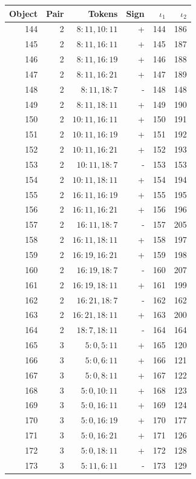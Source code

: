 \begin{center}\begin{tabular}{rrrrrr}\toprule Object & Pair & Tokens & Sign & $\iota_1$ & $\iota_2$\\\midrule
144 & 2 & $8:11,10:11$ & + & 144 & 186\\
145 & 2 & $8:11,16:11$ & + & 145 & 187\\
146 & 2 & $8:11,16:19$ & + & 146 & 188\\
147 & 2 & $8:11,16:21$ & + & 147 & 189\\
148 & 2 & $8:11,18:7$ & - & 148 & 148\\
149 & 2 & $8:11,18:11$ & + & 149 & 190\\
150 & 2 & $10:11,16:11$ & + & 150 & 191\\
151 & 2 & $10:11,16:19$ & + & 151 & 192\\
152 & 2 & $10:11,16:21$ & + & 152 & 193\\
153 & 2 & $10:11,18:7$ & - & 153 & 153\\
154 & 2 & $10:11,18:11$ & + & 154 & 194\\
155 & 2 & $16:11,16:19$ & + & 155 & 195\\
156 & 2 & $16:11,16:21$ & + & 156 & 196\\
157 & 2 & $16:11,18:7$ & - & 157 & 205\\
158 & 2 & $16:11,18:11$ & + & 158 & 197\\
159 & 2 & $16:19,16:21$ & + & 159 & 198\\
160 & 2 & $16:19,18:7$ & - & 160 & 207\\
161 & 2 & $16:19,18:11$ & + & 161 & 199\\
162 & 2 & $16:21,18:7$ & - & 162 & 162\\
163 & 2 & $16:21,18:11$ & + & 163 & 200\\
164 & 2 & $18:7,18:11$ & - & 164 & 164\\
165 & 3 & $5:0,5:11$ & + & 165 & 120\\
166 & 3 & $5:0,6:11$ & + & 166 & 121\\
167 & 3 & $5:0,8:11$ & + & 167 & 122\\
168 & 3 & $5:0,10:11$ & + & 168 & 123\\
169 & 3 & $5:0,16:11$ & + & 169 & 124\\
170 & 3 & $5:0,16:19$ & + & 170 & 177\\
171 & 3 & $5:0,16:21$ & + & 171 & 126\\
172 & 3 & $5:0,18:11$ & + & 172 & 128\\
173 & 3 & $5:11,6:11$ & - & 173 & 129\\

\end{tabular}
\end{center}
